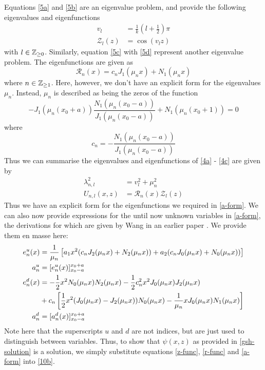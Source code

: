 Equations \ref{5a} and \ref{5b} are an eigenvalue problem, and provide the following eigenvalues and eigenfunctions
\begin{align}
    v_l &= \frac{1}{k} (l + \frac{1}{2}) \pi \\
    \label{z-func} \mathcal{Z}_l(z) &= \cos(v_l z)
\end{align}
with $l \in \mathbb{Z}_{\ge 0}$. Similarly, equation \ref{5c} with \ref{5d} represent another eigenvalue problem. The eigenfunctions 
are given as
\begin{equation}
    \label{r-func} \mathcal{R}_n(x) = c_n J_1(\mu_n x) + N_1(\mu_n x)
\end{equation}
where $n \in \mathbb{Z}_{\ge 1}$. Here, however, we don't have an explicit form for the eigenvalues $\mu_n$. Instead, 
$\mu_n$ is described as being the zeros of the function
\begin{equation}
    -J_1(\mu_n (x_0 + a)) \frac{N_1(\mu_n (x_0 - a))}{J_1 (\mu_n (x_0 - a))} + N_1(\mu_n (x_0 + 1)) = 0
\end{equation}
where
$$c_n = -\frac{N_1(\mu_n (x_0 - a))}{J_1 (\mu_n (x_0 - a))}$$
Thus we can summarise the eigenvalues and eigenfunctions of \ref{4a} - \ref{4c} are given by
\begin{align}
    \lambda_{n,l}^2 &= v_l^2 + \mu_n^2 \\
    U_{n,l}(x,z) &= \mathcal{R}_n(x) \mathcal{Z}_l(z)
\end{align}
Thus we have an explicit form for the eigenfunctions we required in \ref{a-form}. We can also now 
provide expressions for the until now unknown variables in \ref{a-form}, the derivations for which are 
given by Wang in an earlier paper \cite{wang-precursor}. We provide them en masse here:
\begin{align}
    e_n^u(x) &= \frac{1}{\mu_n} \left [ a_1 x^2 (c_n J_2(\mu_n x) + N_2(\mu_n x)) + a_2 (c_n J_0 (\mu_n x) + N_0(\mu_n x)) \right ] \\
    a_n^u &= [e_n^u(x)]_{x_0 - a}^{x_0 + a} \\
    e_n^d(x) &= -\frac{1}{2} x^2 N_0(\mu_n x) N_2(\mu_n x) - \frac{1}{2} c_n^2 x^2 J_0(\mu_n x) J_2(\mu_n x) \\
    \notag &+ c_n \left [ \frac{1}{2}x^2 (J_0(\mu_n x) - J_2(\mu_n x) )N_0(\mu_n x) - \frac{1}{\mu_n} x J_0(\mu_n x) N_1(\mu_n x) \right ] \\
    a_n^d &= [a_n^d (x)]_{x_0-a}^{x_0+a}
\end{align}
Note here that the superscripts $u$ and $d$ are not indices, but are just used to distinguish between variables. Thus, to show that $\psi(x,z)$ as
provided in \ref{gsh-solution} is a solution, we simply substitute equations \ref{z-func}, \ref{r-func} and \ref{a-form} into \ref{10b}.

